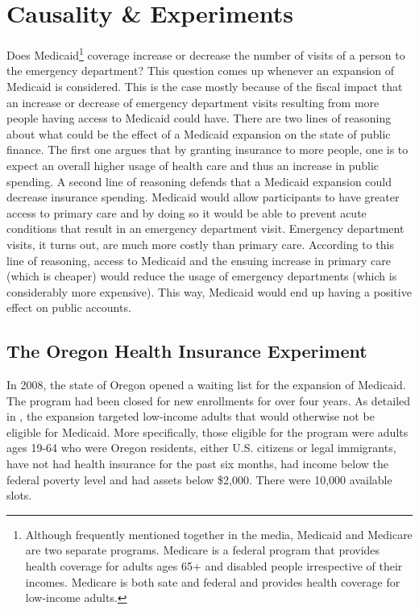 \section{Causality \& Experiments}

Does Medicaid\footnote{Although frequently mentioned together in the media, Medicaid and Medicare are two separate programs. Medicare is a federal program that provides health coverage for adults ages 65+ and disabled people irrespective of their incomes. Medicare is both sate and federal and provides health coverage for low-income adults.} coverage increase or decrease the number of visits of a person to the emergency department? This question comes up whenever an expansion of Medicaid is considered. This is the case mostly because of the fiscal impact that an increase or decrease of emergency department visits resulting from more people having access to Medicaid could have. There are two lines of reasoning about what could be the effect of a Medicaid expansion on the state of public finance. The first one argues that by granting insurance to more people, one is to expect an overall higher usage of health care and thus an increase in public spending. A second line of reasoning defends that a Medicaid expansion could decrease insurance spending. Medicaid would allow participants to have greater access to primary care and by doing so it would be able to prevent acute conditions that result in an emergency department visit. Emergency department visits, it turns out, are much more costly than primary care. According to this line of reasoning, access to Medicaid and the ensuing increase in primary care (which is cheaper) would reduce the usage of emergency departments (which is considerably more expensive). This way, Medicaid would end up having a positive effect on public accounts.

\subsection{The Oregon Health Insurance Experiment}

In 2008, the state of Oregon opened a waiting list for the expansion of Medicaid. The program had been closed for new enrollments for over four years. As detailed in \cite{finkelsteinOregonHealthInsurance2012}, the expansion targeted low-income adults that would otherwise not be eligible for Medicaid. More specifically, those eligible for the program were adults ages 19-64 who were Oregon residents, either U.S. citizens or legal immigrants, have not had health insurance for the past six months, had income below the federal poverty level and had assets below \$2,000. There were 10,000 available slots.

